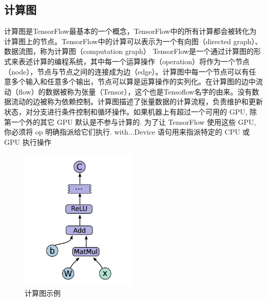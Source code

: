 		\subsection{计算图}
		计算图是TensorFlow最基本的一个概念，TensorFlow中的所有计算都会被转化为计算图上的节点。TensorFlow中的计算可以表示为一个有向图（directed graph）、数据流图，称为计算图（computation graph） 
		TensorFlow是一个通过计算图的形式来表述计算的编程系统，其中每一个运算操作（operation）将作为一个节点（node），节点与节点之间的连接成为边（edge）。计算图中每一个节点可以有任意多个输入和任意多个输出，节点可以算是运算操作的实列化。在计算图的边中流动（flow）的数据被称为张量（Tensor），这个也是Tensoflow名字的由来。没有数据流动的边被称为依赖控制。计算图描述了张量数据的计算流程，负责维护和更新状态，对分支进行条件控制和循环操作。如果机器上有超过一个可用的 GPU, 除第一个外的其它 GPU 默认是不参与计算的. 为了让 TensorFlow 使用这些 GPU, 你必须将 op 明确指派给它们执行. with...Device 语句用来指派特定的 CPU 或 GPU 执行操作
		\begin{figure}[!ht]
			\centering
			\includegraphics[width=0.5\textwidth]{figures/2-1}
			\caption{计算图示例}
			\label{fig:2-1}
		\end{figure}
		

